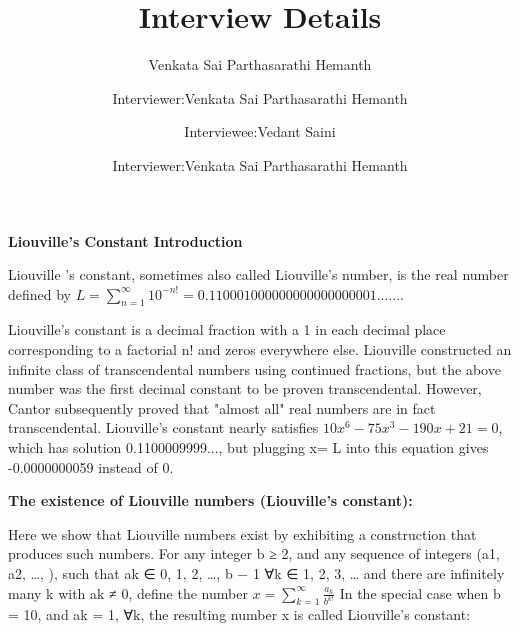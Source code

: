\documentclass[12pt]{article}
\title{Interview Details}
\author{Venkata Sai Parthasarathi Hemanth }
\date{Interviewer:Venkata Sai Parthasarathi Hemanth}
\author{Interviewer:Venkata Sai Parthasarathi Hemanth}
\author{Interviewee:Vedant Saini}
\begin{document}
\begin{rSection}
{\Large \textbf{Liouville's Constant Introduction}}\vspace{1em}
\end{rSection}


Liouville 's constant, sometimes also called Liouville's number, is the real number defined by\newline
\newline
$L=\sum_{n=1}^{\infty} 10^{-n!}=0.110001000000000000000001$.......\newline


Liouville's constant is a decimal fraction with a 1 in each decimal place corresponding to a factorial n! and zeros everywhere else. Liouville constructed an infinite class of transcendental numbers using continued fractions, but the above number was the first decimal constant to be proven transcendental. However, Cantor subsequently proved that "almost all" real numbers are in fact transcendental.
Liouville's constant nearly satisfies\newline
\newline
\newline
$10x^{6}-75x^{3}-190x+21=0$,
\newline
\newline\newline
which has solution 0.1100009999..., but plugging x= L into this equation gives -0.0000000059 instead of 0.
\newline
\newline
\begin{rSection}
{\small \textbf{The existence of Liouville numbers (Liouville's constant):}}\vspace{1em}\newline
\newline
\end{rSection}
Here we show that Liouville numbers exist by exhibiting a construction that produces such numbers.
For any integer b ≥ 2, and any sequence of integers (a1, a2, …, ), such that ak ∈ {0, 1, 2, …, b − 1} ∀k ∈ {1, 2, 3, …} and there are infinitely many k with ak ≠ 0, define the number
\newline
\newline
\newline
$x=\sum_{k=1}^{\infty}\frac{a_k}{b^{k!}}$
\newline
\newline
In the special case when b = 10, and ak = 1, ∀k, the resulting number x is called Liouville's constant:\newline
\end{document}
